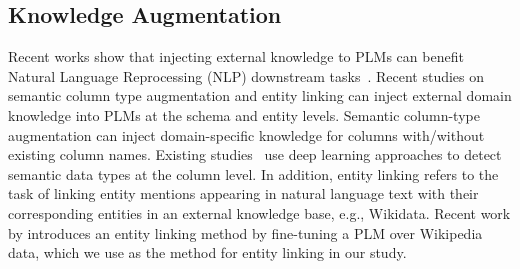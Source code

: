 \subsection{Knowledge Augmentation}
Recent works show that injecting external knowledge to PLMs can benefit Natural Language Reprocessing (NLP) downstream tasks~\cite{zhang_ernie_2019,peters_knowledge_2019,liu_k-bert_2020,wang_k-adapter_2021, wang_kepler_2021}. 
Recent studies on semantic column type augmentation and entity linking can inject external domain knowledge into PLMs at the schema and entity levels. 
Semantic column-type augmentation can inject domain-specific knowledge for columns with/without existing column names. Existing studies~\cite{hulsebos_sherlock_2019,suhara_annotating_2022} use deep learning approaches to detect semantic data types at the column level.
In addition, entity linking \cite{li_deep_2020} refers to the task of linking entity mentions appearing in natural language text with their corresponding entities in an external knowledge base, e.g., Wikidata. 
Recent work by \citet{ayoola_refined_2022} introduces an entity linking method by fine-tuning a PLM over Wikipedia data, which we use as the method for entity linking in our study. 

